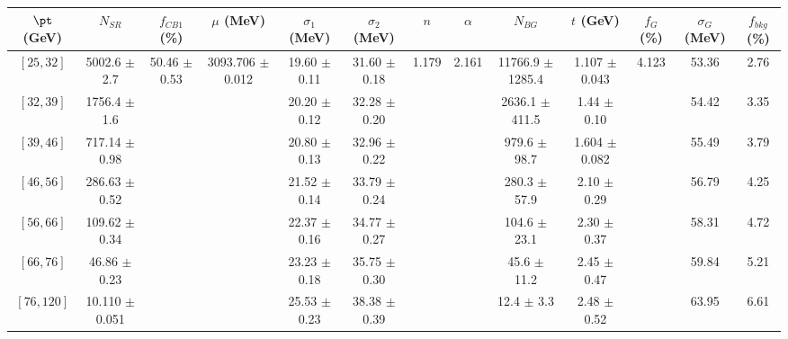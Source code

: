 \begin{tabular}{c||c|c|c|c|c|c|c|c|c|c|c||c}
$\pt$ (GeV) & $N_{SR}$ & $f_{CB1}$ (\%) & $\mu$ (MeV) & $\sigma_1$ (MeV) & $\sigma_2$ (MeV) & $n$ & $\alpha$ & $N_{BG}$ & $t$ (GeV) & $f_G$ (\%) & $\sigma_G$ (MeV) & $f_{bkg}$ (\%) \\
\hline
$[25, 32]$ & 5002.6 $\pm$ 2.7 & \multirow{7}{*}{50.46 $\pm$ 0.53} & \multirow{7}{*}{3093.706 $\pm$ 0.012} & 19.60 $\pm$ 0.11 & 31.60 $\pm$ 0.18 & \multirow{7}{*}{1.179} & \multirow{7}{*}{2.161} & 11766.9 $\pm$ 1285.4 & 1.107 $\pm$ 0.043 & \multirow{7}{*}{4.123} & 53.36 & 2.76\\
$[32, 39]$ & 1756.4 $\pm$ 1.6 &  &  & 20.20 $\pm$ 0.12 & 32.28 $\pm$ 0.20 &  &  & 2636.1 $\pm$ 411.5 & 1.44 $\pm$ 0.10 &  & 54.42 & 3.35\\
$[39, 46]$ & 717.14 $\pm$ 0.98 &  &  & 20.80 $\pm$ 0.13 & 32.96 $\pm$ 0.22 &  &  & 979.6 $\pm$ 98.7 & 1.604 $\pm$ 0.082 &  & 55.49 & 3.79\\
$[46, 56]$ & 286.63 $\pm$ 0.52 &  &  & 21.52 $\pm$ 0.14 & 33.79 $\pm$ 0.24 &  &  & 280.3 $\pm$ 57.9 & 2.10 $\pm$ 0.29 &  & 56.79 & 4.25\\
$[56, 66]$ & 109.62 $\pm$ 0.34 &  &  & 22.37 $\pm$ 0.16 & 34.77 $\pm$ 0.27 &  &  & 104.6 $\pm$ 23.1 & 2.30 $\pm$ 0.37 &  & 58.31 & 4.72\\
$[66, 76]$ & 46.86 $\pm$ 0.23 &  &  & 23.23 $\pm$ 0.18 & 35.75 $\pm$ 0.30 &  &  & 45.6 $\pm$ 11.2 & 2.45 $\pm$ 0.47 &  & 59.84 & 5.21\\
$[76, 120]$ & 10.110 $\pm$ 0.051 &  &  & 25.53 $\pm$ 0.23 & 38.38 $\pm$ 0.39 &  &  & 12.4 $\pm$ 3.3 & 2.48 $\pm$ 0.52 &  & 63.95 & 6.61\\
\end{tabular}
